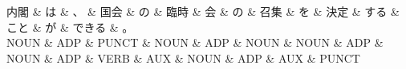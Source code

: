 \documentclass[tikz,border=5pt]{standalone}
\begin{document}
\normalsize
\begin{dependency}[edge unit distance=12.0pt]
    \begin{deptext}[column sep=1em]
        内閣 \& は \& 、 \& 国会 \& の \& 臨時 \& 会 \& の \& 召集 \& を \& 決定 \& する \& こと \& が \& できる \& 。\\
        NOUN \& ADP \& PUNCT \& NOUN \& ADP \& NOUN \& NOUN \& ADP \& NOUN \& ADP \& VERB \& AUX \& NOUN \& ADP \& AUX \& PUNCT\\
    \end{deptext}
\end{dependency}
\end{document}
